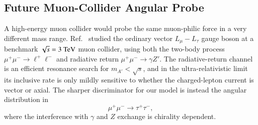 \documentclass[onecolumn, aps, nofootinbib, prd, preprint, floats, floatfix, amsmath, amssymb, superscriptaddress, preprintnumbers]{revtex4-1}
\begin{document}
\subsection{Future Muon-Collider Angular Probe}
\label{subsec:muon-collider-angular}

A high-energy muon collider would probe the same muon-philic force in a very different mass range. Ref.~\cite{Huang:2021nkl} studied the ordinary vector \(L_\mu-L_\tau\) gauge boson at a benchmark \(\sqrt{s}=3~{\rm TeV}\) muon collider, using both the two-body process \(\mu^+\mu^-\to\ell^+\ell^-\) and radiative return \(\mu^+\mu^-\to\gamma Z'\). The radiative-return channel is an efficient resonance search for \(m_{A'}<\sqrt{s}\), and in the ultra-relativistic limit its inclusive rate is only mildly sensitive to whether the charged-lepton current is vector or axial. The sharper discriminator for our model is instead the angular distribution in
\begin{equation}
\mu^+\mu^-\to\tau^+\tau^- ,
\end{equation}
where the interference with \(\gamma\) and \(Z\) exchange is chirality dependent.
\end{document}
